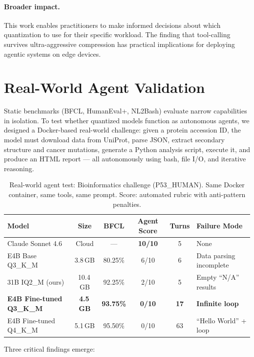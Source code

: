 \documentclass[11pt,a4paper]{article}
\begin{document}
\paragraph{Broader impact.} This work enables practitioners to make informed decisions about which quantization to use for their specific workload. The finding that tool-calling survives ultra-aggressive compression has practical implications for deploying agentic systems on edge devices.

\section{Real-World Agent Validation}

Static benchmarks (BFCL, HumanEval+, NL2Bash) evaluate narrow capabilities in isolation. To test whether quantized models function as autonomous agents, we designed a Docker-based real-world challenge: given a protein accession ID, the model must download data from UniProt, parse JSON, extract secondary structure and cancer mutations, generate a Python analysis script, execute it, and produce an HTML report --- all autonomously using bash, file I/O, and iterative reasoning.

\begin{table}[H]
\centering
\caption{Real-world agent test: Bioinformatics challenge (P53\_HUMAN). Same Docker container, same tools, same prompt. Score: automated rubric with anti-pattern penalties.}
\label{tab:realworld}
\begin{tabular}{lccccl}
\toprule
\textbf{Model} & \textbf{Size} & \textbf{BFCL} & \textbf{Agent Score} & \textbf{Turns} & \textbf{Failure Mode} \\
\midrule
Claude Sonnet 4.6 & Cloud & --- & \textbf{10/10} & 5 & None \\
E4B Base Q3\_K\_M & 3.8\,GB & 80.25\% & 6/10 & 6 & Data parsing incomplete \\
31B IQ2\_M (ours) & 10.4\,GB & 92.25\% & 2/10 & 5 & Empty ``N/A'' results \\
\textbf{E4B Fine-tuned Q3\_K\_M} & \textbf{4.5\,GB} & \textbf{93.75\%} & \textbf{0/10} & \textbf{17} & \textbf{Infinite loop} \\
E4B Fine-tuned Q4\_K\_M & 5.1\,GB & 95.50\% & 0/10 & 63 & ``Hello World'' + loop \\
\bottomrule
\end{tabular}
\end{table}

Three critical findings emerge:
\end{document}
